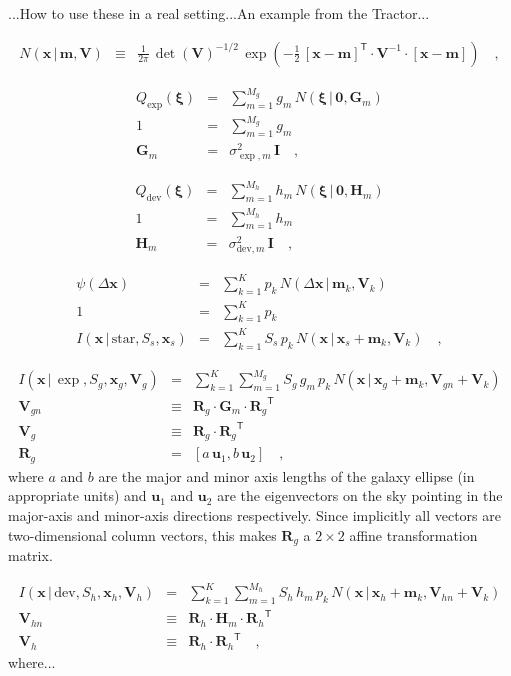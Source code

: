 \documentclass[12pt]{article}
\newcommand{\tmatrix}[1]{\boldsymbol{#1}}
\newcommand{\inverse}[1]{{#1}^{-1}}
\newcommand{\transpose}[1]{{#1}^{\mathsf T}}
\newcommand{\tvector}[1]{\boldsymbol{#1}}
\newcommand{\pos}{\tvector{x}}
\newcommand{\spos}{\tvector{\xi}}
\newcommand{\mean}{\tvector{m}}
\newcommand{\var}{\tmatrix{V}\!}
\newcommand{\Gm}{\tmatrix{G}}
\newcommand{\Hm}{\tmatrix{H}}
\newcommand{\Rm}{\tmatrix{R}}
\newcommand{\uv}{\tvector{u}}
\newcommand{\zero}{\tmatrix{0}}
\newcommand{\identity}{\tmatrix{I}}
\newcommand{\normal}{N}
\newcommand{\given}{\,|\,}
\renewcommand{\star}{\mathrm{star}}
\newcommand{\dev}{\mathrm{dev}}
\begin{document}
...How to use these in a real setting...An example from the Tractor...

\begin{eqnarray}\displaystyle
\normal(\pos\given\mean,\var) &\equiv& \frac{1}{2\pi}\,\det(\var)^{-1/2}\,\exp(-\frac{1}{2}\,\transpose{[\pos-\mean]}\cdot\inverse{\var}\cdot[\pos-\mean])
\quad ,
\end{eqnarray}

\begin{eqnarray}\displaystyle
Q_{\exp}(\spos) &=& \sum_{m=1}^{M_g} g_m\,\normal(\spos\given\zero,\Gm_m)
\\
1 &=& \sum_{m=1}^{M_g} g_m
\\
\Gm_m &=& \sigma^2_{\exp,m}\,\identity
\quad ,
\end{eqnarray}

\begin{eqnarray}\displaystyle
Q_{\dev}(\spos) &=& \sum_{m=1}^{M_h} h_m\,\normal(\spos\given\zero,\Hm_m)
\\
1 &=& \sum_{m=1}^{M_h} h_m
\\
\Hm_m &=& \sigma^2_{\dev,m}\,\identity
\quad ,
\end{eqnarray}

\begin{eqnarray}\displaystyle
\psi(\Delta\pos) &=& \sum_{k=1}^K p_k\,\normal(\Delta\pos\given\mean_k,\var_k)
\\
1 &=& \sum_{k=1}^K p_k
\\
I(\pos\given\star,S_s,\pos_s) &=& \sum_{k=1}^K S_s\,p_k\,\normal(\pos\given\pos_s+\mean_k,\var_k)
\quad ,
\end{eqnarray}

\begin{eqnarray}\displaystyle
I(\pos\given\exp,S_g,\pos_g,\var_g) &=& \sum_{k=1}^K \sum_{m=1}^{M_g} S_g\,g_m\,p_k\,\normal(\pos\given\pos_g+\mean_k,\var_{gn}+\var_k)
\\
\var_{gn} &\equiv& \Rm_g\cdot\Gm_m\cdot\transpose{\Rm_g}
\\
\var_g &\equiv& \Rm_g\cdot\transpose{\Rm_g}
\\
\Rm_g &=& \left[a\,\uv_1 , b\,\uv_2 \right]
\quad ,
\end{eqnarray}
where $a$ and $b$ are the major and minor axis lengths of the galaxy
ellipse (in appropriate units) and $\uv_1$ and $\uv_2$ are the
eigenvectors on the sky pointing in the major-axis and minor-axis
directions respectively.  Since implicitly all vectors are
two-dimensional column vectors, this makes $\Rm_g$ a $2\times 2$
affine transformation matrix.

\begin{eqnarray}\displaystyle
I(\pos\given\dev,S_h,\pos_h,\var_h) &=& \sum_{k=1}^K \sum_{m=1}^{M_h} S_h\,h_m\,p_k\,\normal(\pos\given\pos_h+\mean_k,\var_{hn}+\var_k)
\\
\var_{hn} &\equiv& \Rm_h\cdot\Hm_m\cdot\transpose{\Rm_h}
\\
\var_h &\equiv& \Rm_h\cdot\transpose{\Rm_h}
\quad ,
\end{eqnarray}
where...
\end{document}
